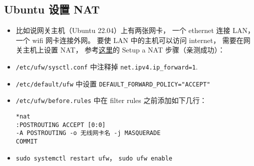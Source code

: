 \subsection{Ubuntu 设置 NAT}
\begin{itemize}
\item 比如说网关主机（Ubuntu 22.04）上有两张网卡， 一个 ethernet 连接 LAN， 一个 wifi 网卡连接外网。 要使 LAN 中的主机可以访问 internet， 需要在网关主机上设置 NAT， 参考\href{https://unix.stackexchange.com/questions/575178/sharing-wifi-internet-through-ethernet-interface}{这里}的 Setup a NAT 步骤（亲测成功）：
\item \verb|/etc/ufw/sysctl.conf| 中注释掉 \verb|net.ipv4.ip_forward=1|.
\item \verb|/etc/default/ufw| 中设置 \verb|DEFAULT_FORWARD_POLICY="ACCEPT"|
\item \verb|/etc/ufw/before.rules| 中在 filter rules 之前添加如下几行：
\begin{lstlisting}[language=none]
*nat
:POSTROUTING ACCEPT [0:0]
-A POSTROUTING -o 无线网卡名 -j MASQUERADE
COMMIT
\end{lstlisting}
\item \verb|sudo systemctl restart ufw|， \verb|sudo ufw enable|
\end{itemize}
